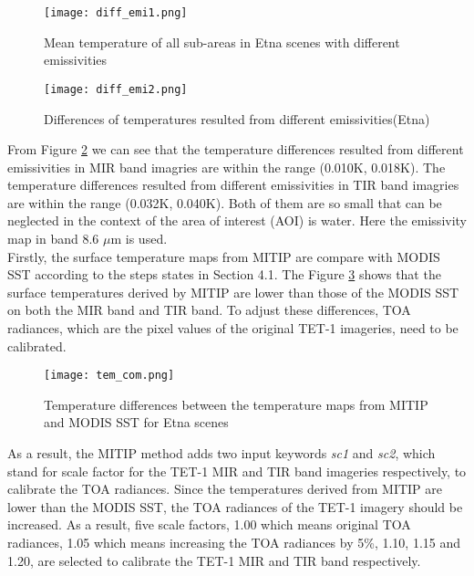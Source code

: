 \begin{figure}[!htbp]
\centering\texttt{[image: diff\_emi1.png]}
\caption{Mean temperature of all sub-areas in Etna scenes with different emissivities}
\label{fig:tem_diff_emi1}
\end{figure}

\begin{figure}[!htbp]
\centering\texttt{[image: diff\_emi2.png]}
\caption{Differences of temperatures resulted from different emissivities(Etna)}
\label{fig:tem_diff_emi2}
\end{figure}

\noindent From Figure \ref{fig:tem_diff_emi2} we can see that the temperature differences resulted from different emissivities in MIR band imagries are within the range (0.010K, 0.018K). The temperature differences resulted from different emissivities in TIR band imagries are within the range (0.032K, 0.040K). Both of them are so small that can be neglected in the context of the area of interest (AOI) is water. Here the emissivity map in band 8.6 $\mu$m is used.\\

\noindent Firstly, the surface temperature maps from MITIP are compare with MODIS SST according to the steps states in Section 4.1. The Figure \ref{fig:tem_com} shows that the surface temperatures derived by MITIP are lower than those of the MODIS SST on both the MIR band and TIR band. To adjust these differences, TOA radiances, which are the pixel values of the original TET-1 imageries, need to be calibrated.\\

\begin{figure}[!htbp]
\centering\texttt{[image: tem\_com.png]}
\caption{Temperature differences between the temperature maps from MITIP and MODIS SST for Etna scenes}
\label{fig:tem_com}
\end{figure}

\noindent As a result, the MITIP method adds two input keywords \emph{sc1} and \emph{sc2}, which stand for scale factor for the TET-1 MIR and TIR band imageries respectively, to calibrate the TOA radiances. Since the temperatures derived from MITIP are lower than the MODIS SST, the TOA radiances of the TET-1 imagery should be increased. As a result, five scale factors, 1.00 which means original TOA radiances, 1.05 which means increasing the TOA radiances by 5\%, 1.10, 1.15 and 1.20, are selected to calibrate the TET-1 MIR and TIR band respectively.\\

